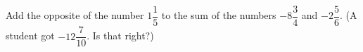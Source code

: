 Add the opposite of the number $1\dfrac{1}{5}$ to the sum of the numbers $-8\dfrac{3}{4}$ and $-2\dfrac{5}{6}$. (A student got $-12\dfrac{7}{10}$. Is that right?)
